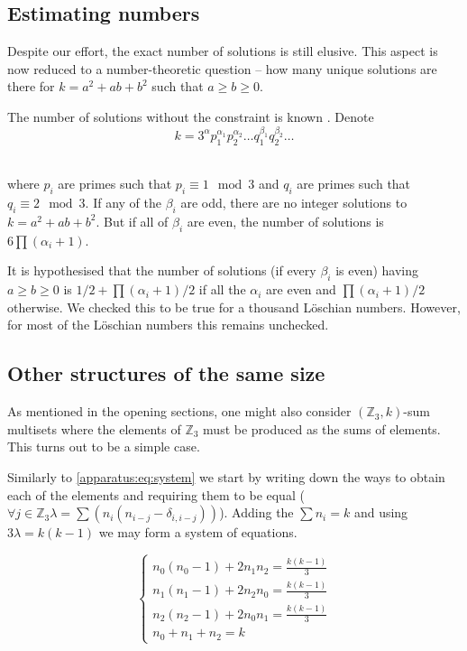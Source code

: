 \documentclass{article}
\theoremstyle{plain}
\theoremstyle{definition}
\theoremstyle{remark}
\begin{document}
		\subsection{Estimating numbers}
			Despite our effort, the exact number of solutions is still elusive. This aspect is now reduced to a number-theoretic question -- how many unique solutions are there for $k=a^2+ab+b^2$ such that $a\geq b\geq 0$.
		
			The number of solutions without the constraint is known \cite{marmon2005hexagonal}. Denote
			\begin{equation}
				k=3^\alpha p_1^{\alpha_1}p_2^{\alpha_2}\ldots q_1^{\beta_1}q_2^{\beta_2}\ldots
			\end{equation}\
			
			where $p_i$ are primes such that $p_i \equiv 1 \mod 3$ and $q_i$ are primes such that $q_i \equiv 2 \mod 3$. If any of the $\beta_i$ are odd, there are no integer solutions to $k=a^2+ab+b^2$. But if all of $\beta_i$ are even, the number of solutions is $6\prod (\alpha_i +1)$.
			
			It is hypothesised \cite{nair2004elementary} that the number of solutions (if every $\beta_i$ is even) having $a \geq b \geq 0$ is $1/2 + \prod (\alpha_i +1)/2$ if all the $\alpha_i$ are even and $\prod (\alpha_i +1)/2$ otherwise. We checked this to be true for a thousand Löschian numbers. However, for most of the Löschian numbers this remains unchecked.
	
		\subsection{Other structures of the same size}
			As mentioned in the opening sections, one might also consider $(\mathbb Z_3,k)$-sum multisets where the elements of $\mathbb Z_3$ must be produced as the sums of elements. This turns out to be a simple case.

			Similarly to \eqref{apparatus:eq:system} we start by writing down the ways to obtain each of the elements and requiring them to be equal ($\forall j \in \mathbb Z_3 \lambda = \sum (n_i(n_{i-j}-\delta_{i,i-j}))$). Adding the $\sum n_i = k$ and using $3\lambda = k(k-1)$ we may form a system of equations.
			
			\begin{equation}
				\label{v3:other:eq:system}
				\begin{cases}
					n_0 (n_0-1) + 2 n_1 n_2 = \frac{k(k-1)}{3} \\
					n_1 (n_1-1) + 2 n_2 n_0 = \frac{k(k-1)}{3} \\
					n_2 (n_2-1) + 2 n_0 n_1 = \frac{k(k-1)}{3} \\
					n_0 + n_1 + n_2 = k
				\end{cases}
			\end{equation}
	
\end{document}
